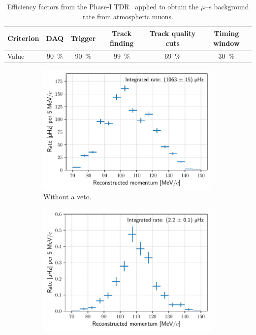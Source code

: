 \begin{table}[t]
    \centering
    \begin{tabular}{l|ccccc}
        \toprule
        Criterion&DAQ&Trigger&Track finding&Track quality cuts&Timing window\\\midrule
        Value&\SI{90}{\percent}&\SI{90}{\percent}&\SI{99}{\percent}&\SI{69}{\percent}&\SI{30}{\percent}\\
        \bottomrule
    \end{tabular}
    \caption{Efficiency factors from the Phase-I
    TDR~\cite{the_comet_collaboration_comet_2020} applied to obtain the
    $\mu$--$e$ background rate from atmospheric muons.}
    \label{tab:bmc_bg_efficiencies}
\end{table}

\begin{figure}[t]
    \centering
    \begin{subfigure}[t]{0.48\textwidth}
        \centering
        \includegraphics[width=0.99\textwidth]{chapter5/bmc_background_rate_no_crv.pdf}
        \caption{Without a veto.}
        \label{fig:bmc_rate_vs_momentum_no_crv}
    \end{subfigure}
    \hfill
    \begin{subfigure}[t]{0.48\textwidth}
        \centering
        \includegraphics[width=0.99\textwidth]{chapter5/bmc_background_rate_with_crv.pdf}

\end{subfigure}
\end{figure}
